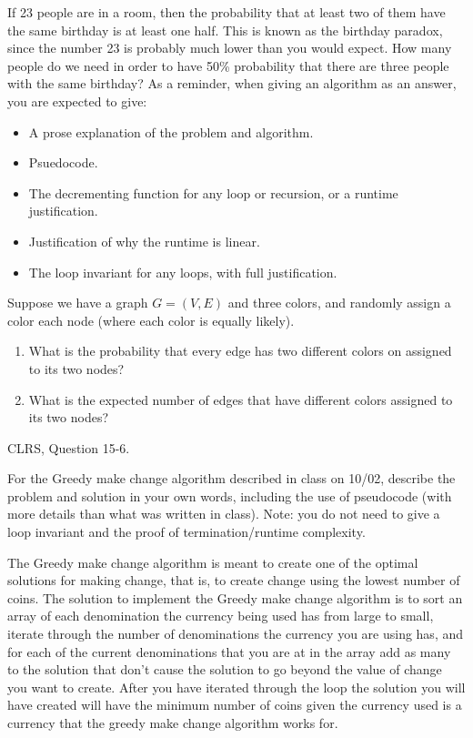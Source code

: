 \documentclass{article}
\author{Group: 7 Names: Peter Gifford, Kyle Brekke, Madison Henson, Ren Wall}
\date{due: 18 October 2019}
\begin{document}
\nextprob
If 23 people are in a room, then the probability that at least two of them have
the same birthday is at least one half.  This is known as the birthday paradox,
since the number 23 is probably much lower than you would expect.  How many
people do we need in order to have 50\% probability that there are three people
with the same birthday?
As a reminder, when giving an algorithm as an answer, you
are expected to give:
\begin{itemize}
    \item A prose explanation of the problem and algorithm.
    \item Psuedocode.
    \item The decrementing function for any loop or recursion, or a runtime
        justification.
    \item Justification of why the runtime is linear.
    \item The loop invariant for any loops, with full justification.
\end{itemize}
   
\nextprob
Suppose we have a graph $G=(V,E)$ and three colors, and randomly assign a color
each node (where each color is equally likely).
\begin{enumerate}
    \item What is the probability that every edge has two different colors on
        assigned to its two nodes?
    \item What is the expected number of edges that have different colors
        assigned to its two nodes?
\end{enumerate}

\nextprob
CLRS, Question 15-6.

\nextprob
For the Greedy make change algorithm described in class on 10/02, describe the
problem and solution in your own words, including the use of pseudocode (with
more details than what was written in class).  Note: you do not need to give a
loop invariant and the proof of termination/runtime complexity.


The Greedy make change algorithm is meant to create one of the optimal solutions for making change, that is, to create change using the lowest number of coins. The solution to implement the Greedy make change algorithm is to sort an array of each denomination the currency being used has from large to small, iterate through the number of denominations the currency you are using has, and for each of the current denominations that you are at in the array add as many to the solution that don't cause the solution to go beyond the value of change you want to create. After you have iterated through the loop the solution you will have created will have the minimum number of coins given the currency used is a currency that the greedy make change algorithm works for. 
\end{document}
